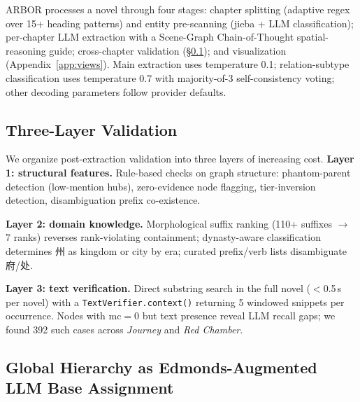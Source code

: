 \documentclass[11pt]{article}
\newenvironment{CJK}[2]{}{}
\begin{document}
ARBOR processes a novel through four stages: chapter splitting (adaptive regex over 15+ heading patterns) and entity pre-scanning (jieba + LLM classification); per-chapter LLM extraction with a Scene-Graph Chain-of-Thought spatial-reasoning guide; cross-chapter validation (\S\ref{sec:validation}); and visualization (Appendix~\ref{app:views}). Main extraction uses temperature 0.1; relation-subtype classification uses temperature 0.7 with majority-of-3 self-consistency voting; other decoding parameters follow provider defaults.

\subsection{Three-Layer Validation}
\label{sec:validation}

We organize post-extraction validation into three layers of increasing cost.
\textbf{Layer 1: structural features.} Rule-based checks on graph structure: phantom-parent detection (low-mention hubs), zero-evidence node flagging, tier-inversion detection, disambiguation prefix co-existence.

\textbf{Layer 2: domain knowledge.} Morphological suffix ranking (110+ suffixes $\rightarrow$ 7 ranks) reverses rank-violating containment; dynasty-aware classification determines \begin{CJK}{UTF8}{gbsn}州\end{CJK} as kingdom or city by era; curated prefix/verb lists disambiguate \begin{CJK}{UTF8}{gbsn}府\end{CJK}/\begin{CJK}{UTF8}{gbsn}处\end{CJK}.

\textbf{Layer 3: text verification.} Direct substring search in the full novel ($<$0.5\,s per novel) with a \texttt{TextVerifier.context()} returning 5 windowed snippets per occurrence. Nodes with mc$=$0 but text presence reveal LLM recall gaps; we found 392 such cases across \textit{Journey} and \textit{Red Chamber}.

\subsection{Global Hierarchy as Edmonds-Augmented LLM Base Assignment}
\label{sec:hierarchy}
\end{document}
